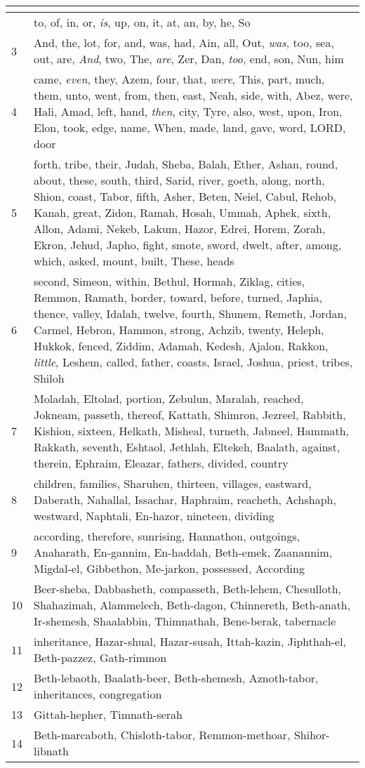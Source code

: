 \begin{center}
\begin{longtable}{l|p{3.75in}}
\hline \multicolumn{2}{c}{{ }} \\ \hline
\endfoot 
2 & to, of, in, or, \emph{is}, up, on, it, at, an, by, he, So\\ \hline 
3 & And, the, lot, for, and, was, had, Ain, all, Out, \emph{was}, too, sea, out, are, \emph{And}, two, The, \emph{are}, Zer, Dan, \emph{too}, end, son, Nun, him\\ \hline 
4 & came, \emph{even}, they, Azem, four, that, \emph{were}, This, part, much, them, unto, went, from, then, east, Neah, side, with, Abez, were, Hali, Amad, left, hand, \emph{then}, city, Tyre, also, west, upon, Iron, Elon, took, edge, name, When, made, land, gave, word, LORD, door\\ \hline 
5 & forth, tribe, their, Judah, Sheba, Balah, Ether, Ashan, round, about, these, south, third, Sarid, river, goeth, along, north, Shion, coast, Tabor, fifth, Asher, Beten, Neiel, Cabul, Rehob, Kanah, great, Zidon, Ramah, Hosah, Ummah, Aphek, sixth, Allon, Adami, Nekeb, Lakum, Hazor, Edrei, Horem, Zorah, Ekron, Jehud, Japho, fight, smote, sword, dwelt, after, among, which, asked, mount, built, These, heads\\ \hline 
6 & second, Simeon, within, Bethul, Hormah, Ziklag, cities, Remmon, Ramath, border, toward, before, turned, Japhia, thence, valley, Idalah, twelve, fourth, Shunem, Remeth, Jordan, Carmel, Hebron, Hammon, strong, Achzib, twenty, Heleph, Hukkok, fenced, Ziddim, Adamah, Kedesh, Ajalon, Rakkon, \emph{little}, Leshem, called, father, coasts, Israel, Joshua, priest, tribes, Shiloh\\ \hline 
7 & Moladah, Eltolad, portion, Zebulun, Maralah, reached, Jokneam, passeth, thereof, Kattath, Shimron, Jezreel, Rabbith, Kishion, sixteen, Helkath, Misheal, turneth, Jabneel, Hammath, Rakkath, seventh, Eshtaol, Jethlah, Eltekeh, Baalath, against, therein, Ephraim, Eleazar, fathers, divided, country\\ \hline 
8 & children, families, Sharuhen, thirteen, villages, eastward, Daberath, Nahallal, Issachar, Haphraim, reacheth, Achshaph, westward, Naphtali, En-hazor, nineteen, dividing\\ \hline 
9 & according, therefore, sunrising, Hannathon, outgoings, Anaharath, En-gannim, En-haddah, Beth-emek, Zaanannim, Migdal-el, Gibbethon, Me-jarkon, possessed, According\\ \hline 
10 & Beer-sheba, Dabbasheth, compasseth, Beth-lehem, Chesulloth, Shahazimah, Alammelech, Beth-dagon, Chinnereth, Beth-anath, Ir-shemesh, Shaalabbin, Thimnathah, Bene-berak, tabernacle\\ \hline 
11 & inheritance, Hazar-shual, Hazar-susah, Ittah-kazin, Jiphthah-el, Beth-pazzez, Gath-rimmon\\ \hline 
12 & Beth-lebaoth, Baalath-beer, Beth-shemesh, Aznoth-tabor, inheritances, congregation\\ \hline 
13 & Gittah-hepher, Timnath-serah\\ \hline 
14 & Beth-marcaboth, Chisloth-tabor, Remmon-methoar, Shihor-libnath\\ \hline 
\end{longtable}
\end{center}





